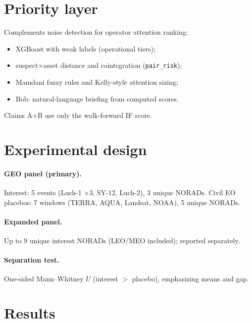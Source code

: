 \documentclass[11pt,a4paper]{article}
\begin{document}
\section{Priority layer}
\label{sec:priority}

Complements noise detection for operator attention ranking:
\begin{itemize}[leftmargin=*]
  \item XGBoost with weak labels (operational tiers);
  \item suspect$\times$asset distance and cointegration (\texttt{pair\_risk});
  \item Mamdani fuzzy rules and Kelly-style attention sizing;
  \item Bob: natural-language briefing from computed scores.
\end{itemize}
Claims A+B use only the walk-forward IF score.

\section{Experimental design}
\label{sec:design}

\paragraph{GEO panel (primary).}
Interest: 5 events (Luch-1 $\times$3, SY-12, Luch-2), 3 unique NORADs.
Civil EO placebos: 7 windows (TERRA, AQUA, Landsat, NOAA), 5 unique NORADs.

\paragraph{Expanded panel.}
Up to 9 unique interest NORADs (LEO/MEO included); reported separately.

\paragraph{Separation test.}
One-sided Mann--Whitney \(U\) (interest $>$ placebo), emphasizing means and gap.

\section{Results}
\label{sec:results}
\end{document}
